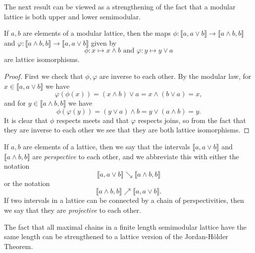 \begin{appendices}
The next result can be viewed as a strengthening of the fact that a modular lattice is both upper and lower semimodular.%

\begin{thm}\label{diamond-isom-lattice} If $a,b$ are elements of a modular lattice, then the maps $\phi : \llbracket a, a\vee b\rrbracket \rightarrow \llbracket a\wedge b, b\rrbracket$ and $\varphi: \llbracket a\wedge b, b\rrbracket \rightarrow \llbracket a, a \vee b\rrbracket$ given by
\[
\phi : x \mapsto x\wedge b \text{ and } \varphi : y \mapsto y\vee a
\]
are lattice isomorphisms.
\end{thm}
\begin{proof} First we check that $\phi, \varphi$ are inverse to each other. By the modular law, for $x \in \llbracket a, a \vee b \rrbracket$ we have
\[
\varphi(\phi(x)) = (x \wedge b) \vee a = x \wedge (b \vee a) = x,
\]
and for $y \in \llbracket a \wedge b, b \rrbracket$ we have
\[
\phi(\varphi(y)) = (y \vee a) \wedge b = y \vee (a \wedge b) = y.
\]
It is clear that $\phi$ respects meets and that $\varphi$ respects joins, so from the fact that they are inverse to each other we see that they are both lattice isomorphisms.
\end{proof}

\begin{defn} If $a, b$ are elements of a lattice, then we say that the intervals $\llbracket a, a \vee b \rrbracket$ and $\llbracket a \wedge b, b\rrbracket$ are \emph{perspective} to each other, and we abbreviate this with either the notation
\[
\llbracket a, a \vee b \rrbracket \searrow \llbracket a \wedge b, b \rrbracket
\]
or the notation
\[
\llbracket a \wedge b, b \rrbracket \nearrow \llbracket a, a \vee b\rrbracket.
\]
If two intervals in a lattice can be connected by a chain of perspectivities, then we say that they are \emph{projective} to each other.
\end{defn}

The fact that all maximal chains in a finite length semimodular lattice have the same length can be strengthened to a lattice version of the Jordan-H\"older Theorem.


\end{appendices}
